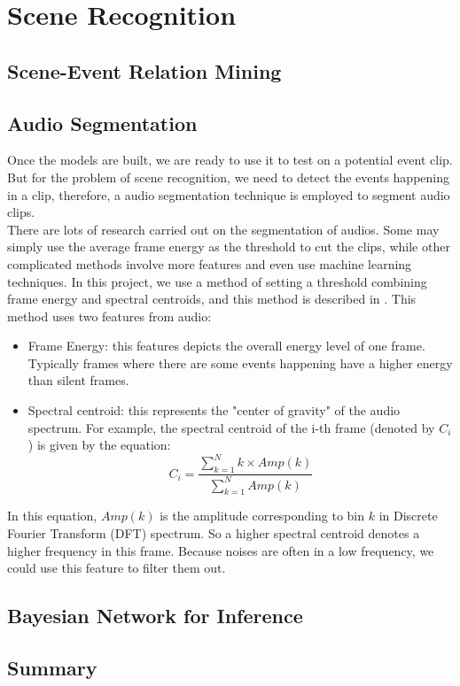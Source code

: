 \chapter{Scene Recognition}

\section{Scene-Event Relation Mining}

\section{Audio Segmentation}
Once the models are built, we are ready to use it to test on a potential event clip. 
But for the problem of scene recognition, we need to detect the   events happening in a clip, therefore, a audio segmentation technique is employed to segment audio clips. \\ 

There are lots of research carried out on the segmentation of audios.
Some may simply use the average frame energy as the threshold to cut the clips, while other complicated methods involve more features and even use machine learning techniques. 
In this project, we use a method of setting a threshold combining frame energy and spectral centroids, and this method is described in \cite{giannakopoulos2009method}.
This method uses two features from audio:
\begin{itemize}
\item{Frame Energy: this features depicts the overall energy level of one frame. Typically frames where there are some events happening have a higher energy than silent frames.}
\item{Spectral centroid: this represents the "center of gravity" of the audio spectrum. For example, the spectral centroid of the i-th frame (denoted by $ C_i$) is given by the equation:
\[
C_i = \frac{\sum\limits_{k=1}^Nk\times Amp(k)}{\sum\limits_{k=1}^NAmp(k)}
\]
}
\end{itemize}

In this equation, $Amp(k)$ is the amplitude corresponding to bin $k$ in Discrete Fourier Transform (DFT) spectrum. 
So a higher spectral centroid denotes a higher frequency in this frame. Because noises are often in a low frequency, we could use this feature to filter them out. 

\section{Bayesian Network for Inference}

\section{Summary}
